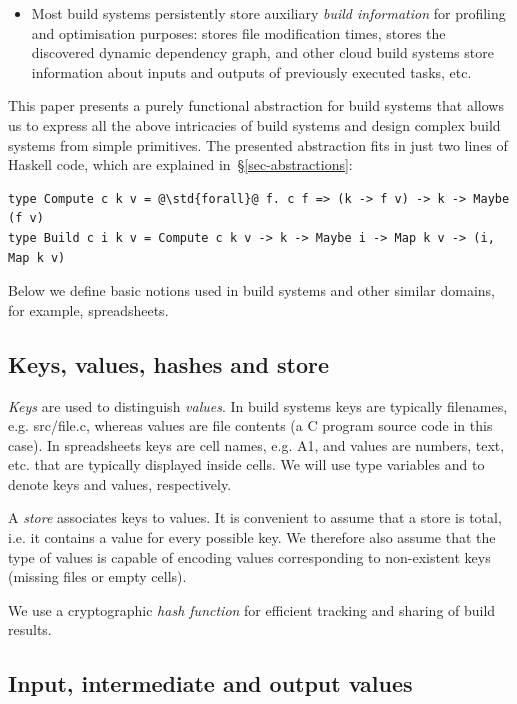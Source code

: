 \begin{itemize}
    \item Most build systems persistently store auxiliary \emph{build
    information} for profiling and optimisation purposes: \Make stores file
    modification times, \Shake stores the discovered dynamic dependency graph,
    \Bazel and other cloud build systems store information about inputs and
    outputs of previously executed tasks, etc.
\end{itemize}

This paper presents a purely functional abstraction for build systems that
allows us to express all the above intricacies of build systems and design
complex build systems from simple primitives. The presented abstraction fits in
just two lines of Haskell code, which are explained
in~\S\ref{sec-abstractions}:

\begin{verbatim}
type Compute c k v = @\std{forall}@ f. c f => (k -> f v) -> k -> Maybe (f v)
type Build c i k v = Compute c k v -> k -> Maybe i -> Map k v -> (i, Map k v)
\end{verbatim}


Below we define basic notions used in build systems and other similar domains,
for example, spreadsheets.

\subsection{Keys, values, hashes and store}

\emph{Keys} are used to distinguish \emph{values}. In build systems keys are
typically filenames, e.g. \textsf{src/file.c}, whereas values are file contents
(a C program source code in this case). In spreadsheets keys are cell names,
e.g. \textsf{A1}, and values are numbers, text, etc. that are typically displayed
inside cells. We will use type variables  and  to denote keys and
values, respectively.

A \emph{store} associates keys to values. It is convenient to assume that a store
is total, i.e. it contains a value for every possible key. We therefore also
assume that the type of values is capable of encoding values corresponding to
non-existent keys (missing files or empty cells).

We use a cryptographic \emph{hash function}  for
efficient tracking and sharing of build results.

\subsection{Input, intermediate and output values}

